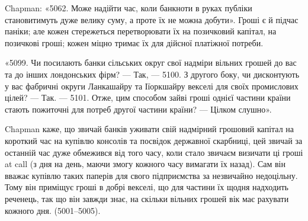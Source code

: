 Chapman: «5062. Може надійти час, коли банкноти в руках публіки становитимуть
дуже велику суму, а проте їх не можна добути». Гроші є й підчас
паніки; але кожен стережеться перетворювати їх на позичковий капітал, на
позичкові гроші; кожен міцно тримає їх для дійсної платіжної потреби.

«5099. Чи посилають банки сільських округ свої надміри вільних грошей
до вас та до інших лондонських фірм? — Так, — 5100. З другого боку, чи дисконтують
у вас фабричні округи Ланкашайру та Іїоркшайру векселі для своїх
промислових цілей? — Так. — 5101. Отже, цим способом зайві гроші однієї частини
країни стають пожиточні для потреб другої частини країни? — Цілком слушно».

Chapman каже, що звичай банків уживати свій надмірний грошовий капітал
на короткий час на купівлю консолів та посвідок державної скарбниці, цей звичай
за останній час дуже обмежився від того часу, коли стало звичаєм визичати ці
гроші at call (з дня на день, маючи змогу кожного часу вимагати їх назад).
Сам він вважає купівлю таких паперів для свого підприємства за незвичайно
недоцільну. Тому він приміщує гроші в добрі векселі, що для частини їх щодня
надходить реченець, так що він завжди знає, на скільки вільних грошей вік
має рахувати кожного дня. (5001--5005).
\parbreak{}  %
